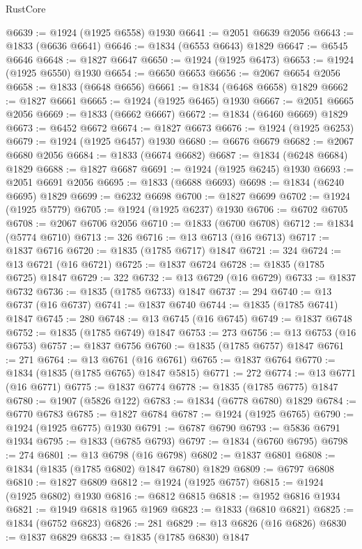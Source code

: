 \begin{lexlean}{RustCore}
\begin{coremodule}
@6639 := @1924 (@1925 @6558) @1930
@6641 := @2051 @6639 @2056
@6643 := @1833 (@6636 @6641)
@6646 := @1834 (@6553 @6643) @1829
@6647 := @6545 @6646
@6648 := @1827 @6647
@6650 := @1924 (@1925 @6473)
@6653 := @1924 (@1925 @6550) @1930
@6654 := @6650 @6653
@6656 := @2067 @6654 @2056
@6658 := @1833 (@6648 @6656)
@6661 := @1834 (@6468 @6658) @1829
@6662 := @1827 @6661
@6665 := @1924 (@1925 @6465) @1930
@6667 := @2051 @6665 @2056
@6669 := @1833 (@6662 @6667)
@6672 := @1834 (@6460 @6669) @1829
@6673 := @6452 @6672
@6674 := @1827 @6673
@6676 := @1924 (@1925 @6253)
@6679 := @1924 (@1925 @6457) @1930
@6680 := @6676 @6679
@6682 := @2067 @6680 @2056
@6684 := @1833 (@6674 @6682)
@6687 := @1834 (@6248 @6684) @1829
@6688 := @1827 @6687
@6691 := @1924 (@1925 @6245) @1930
@6693 := @2051 @6691 @2056
@6695 := @1833 (@6688 @6693)
@6698 := @1834 (@6240 @6695) @1829
@6699 := @6232 @6698
@6700 := @1827 @6699
@6702 := @1924 (@1925 @5779)
@6705 := @1924 (@1925 @6237) @1930
@6706 := @6702 @6705
@6708 := @2067 @6706 @2056
@6710 := @1833 (@6700 @6708)
@6712 := @1834 (@5774 @6710)
@6713 := 326
@6716 := @13 @6713 (@16 @6713)
@6717 := @1837 @6716
@6720 := @1835 (@1785 @6717) @1847
@6721 := 324
@6724 := @13 @6721 (@16 @6721)
@6725 := @1837 @6724
@6728 := @1835 (@1785 @6725) @1847
@6729 := 322
@6732 := @13 @6729 (@16 @6729)
@6733 := @1837 @6732
@6736 := @1835 (@1785 @6733) @1847
@6737 := 294
@6740 := @13 @6737 (@16 @6737)
@6741 := @1837 @6740
@6744 := @1835 (@1785 @6741) @1847
@6745 := 280
@6748 := @13 @6745 (@16 @6745)
@6749 := @1837 @6748
@6752 := @1835 (@1785 @6749) @1847
@6753 := 273
@6756 := @13 @6753 (@16 @6753)
@6757 := @1837 @6756
@6760 := @1835 (@1785 @6757) @1847
@6761 := 271
@6764 := @13 @6761 (@16 @6761)
@6765 := @1837 @6764
@6770 := @1834 (@1835 (@1785 @6765) @1847 @5815)
@6771 := 272
@6774 := @13 @6771 (@16 @6771)
@6775 := @1837 @6774
@6778 := @1835 (@1785 @6775) @1847
@6780 := @1907 (@5826 @122)
@6783 := @1834 (@6778 @6780) @1829
@6784 := @6770 @6783
@6785 := @1827 @6784
@6787 := @1924 (@1925 @6765)
@6790 := @1924 (@1925 @6775) @1930
@6791 := @6787 @6790
@6793 := @5836 @6791 @1934
@6795 := @1833 (@6785 @6793)
@6797 := @1834 (@6760 @6795)
@6798 := 274
@6801 := @13 @6798 (@16 @6798)
@6802 := @1837 @6801
@6808 := @1834 (@1835 (@1785 @6802) @1847 @6780) @1829
@6809 := @6797 @6808
@6810 := @1827 @6809
@6812 := @1924 (@1925 @6757)
@6815 := @1924 (@1925 @6802) @1930
@6816 := @6812 @6815
@6818 := @1952 @6816 @1934
@6821 := @1949 @6818 @1965 @1969
@6823 := @1833 (@6810 @6821)
@6825 := @1834 (@6752 @6823)
@6826 := 281
@6829 := @13 @6826 (@16 @6826)
@6830 := @1837 @6829
@6833 := @1835 (@1785 @6830) @1847

\end{coremodule}
\end{lexlean}
